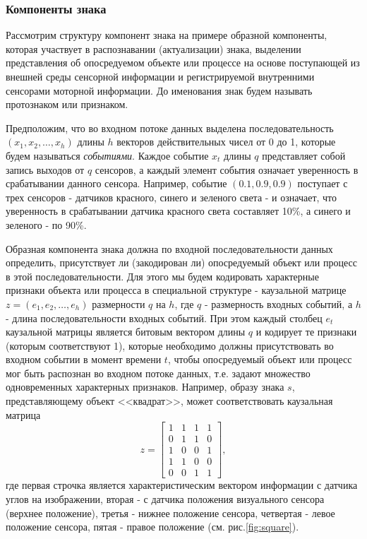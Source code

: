 \documentclass[12pt]{report}
\begin{document}
	\subsubsection{Компоненты знака}\label{subsec:components}
	
	Рассмотрим структуру компонент знака на примере образной компоненты, которая участвует в распознавании (актуализации) знака, выделении представления об опосредуемом объекте или процессе на основе поступающей из внешней среды сенсорной информации и регистрируемой внутренними сенсорами моторной информации. До именования знак будем называть протознаком или признаком.
	
	Предположим, что во входном потоке данных выделена последовательность $(x_1,x_2,\dots,x_h)$ длины $h$ векторов действительных чисел от 0 до 1, которые будем называться \textit{событиями}. Каждое событие $x_t$ длины $q$ представляет собой запись выходов от $q$ сенсоров, а каждый элемент события означает уверенность в срабатывании данного сенсора. Например, событие $(0.1, 0.9, 0.9)$ поступает с трех сенсоров - датчиков красного, синего и зеленого света - и означает, что уверенность в срабатывании датчика красного света составляет 10\%, а синего и зеленого - по 90\%.
	
	Образная компонента знака должна по входной последовательности данных определить, присутствует ли (закодирован ли) опосредуемый объект или процесс в этой последовательности. Для этого мы будем кодировать характерные признаки объекта или процесса в специальной структуре - каузальной матрице $z=(e_1,e_2,\dots,e_h)$ размерности $q$ на $h$, где $q$ - размерность входных событий, а $h$ - длина последовательности входных событий. При этом каждый столбец $e_t$ каузальной матрицы является битовым вектором длины $q$ и кодирует те признаки (которым соответствуют 1), которые необходимо должны присутствовать во входном событии в момент времени $t$, чтобы опосредуемый объект или процесс мог быть распознан во входном потоке данных, т.е. задают множество одновременных характерных признаков. Например, образу знака $s$, представляющему объект <<квадрат>>, может соответствовать каузальная матрица 
	\[
	\renewcommand\arraystretch{0.5}
	z=\begin{bmatrix}
	1&1&1&1\\
	0&1&1&0\\
	1&0&0&1\\
	1&1&0&0\\
	0&0&1&1
	\end{bmatrix},
	\]
	где первая строчка является характеристическим вектором информации с датчика углов на изображении, вторая - с датчика положения визуального сенсора (верхнее положение), третья - нижнее положение сенсора, четвертая - левое положение сенсора, пятая - правое положение (см. рис.\ref{fig:square}).
	
\end{document}

